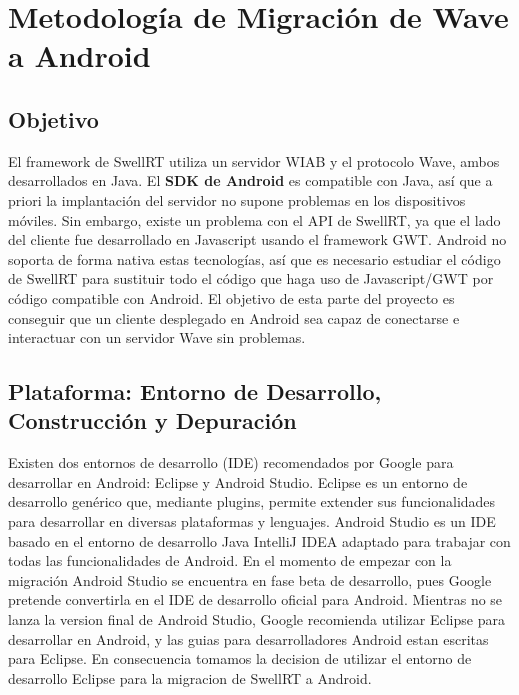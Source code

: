 \section{Metodología de Migración de Wave a Android}

	\subsection{Objetivo}
  
    El framework de SwellRT utiliza un servidor WIAB y el protocolo Wave, ambos desarrollados en Java. El \textbf{SDK de Android} \cite{ref:android_sdk} es compatible con Java, así que a priori la implantación del servidor no supone problemas en los dispositivos móviles. Sin embargo, existe un problema con el API de SwellRT, ya que el lado del cliente fue desarrollado en Javascript usando el framework GWT. Android no soporta de forma nativa estas tecnologías, así que es necesario estudiar el código de SwellRT para sustituir todo el código que haga uso de Javascript/GWT por código compatible con Android. El objetivo de esta parte del proyecto es conseguir que un cliente desplegado en Android sea capaz de conectarse e interactuar con un servidor Wave sin problemas.  
  
  \subsection{Plataforma: Entorno de Desarrollo, Construcción y Depuración}
  
    Existen dos entornos de desarrollo (IDE) recomendados por Google para desarrollar en Android: Eclipse \cite{ref:eclipse} y Android Studio.\cite{ref:android_studio} Eclipse es un entorno de desarrollo genérico que, mediante plugins, permite extender sus funcionalidades para desarrollar en diversas plataformas y lenguajes. Android Studio es un IDE basado en el entorno de desarrollo Java IntelliJ IDEA \cite{ref:intelliJ_Idea} adaptado para trabajar con todas las funcionalidades de Android. En el momento de empezar con la migración Android Studio se encuentra en fase beta de desarrollo, pues Google pretende convertirla en el IDE de desarrollo oficial para Android. Mientras no se lanza la version final de Android Studio, Google recomienda utilizar Eclipse para desarrollar en Android, y las guias para desarrolladores Android estan escritas para Eclipse. En consecuencia tomamos la decision de utilizar el entorno de desarrollo Eclipse para la migracion de SwellRT a Android. 

